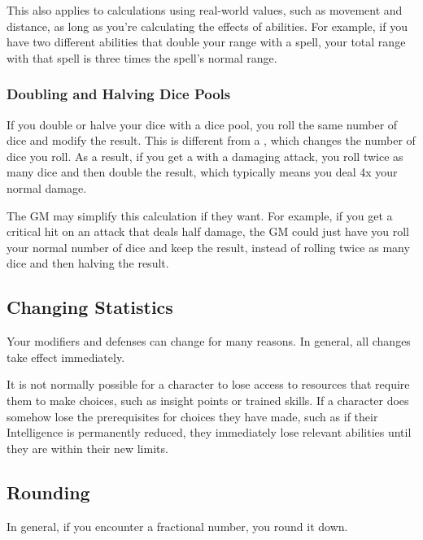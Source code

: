         This also applies to calculations using real-world values, such as movement and distance, as long as you're calculating the effects of abilities.
        For example, if you have two different abilities that double your range with a spell, your total range with that spell is three times the spell's normal range.

        \subsubsection{Doubling and Halving Dice Pools}
            If you double or halve your dice with a dice pool, you roll the same number of dice and modify the result.
            This is different from a , which changes the number of dice you roll.
            As a result, if you get a  with a damaging attack, you roll twice as many dice and then double the result, which typically means you deal 4x your normal damage.

            The GM may simplify this calculation if they want.
            For example, if you get a critical hit on an attack that deals half damage, the GM could just have you roll your normal number of dice and keep the result, instead of rolling twice as many dice and then halving the result.

    \subsection{Changing Statistics}

        Your modifiers and defenses can change for many reasons.
        In general, all changes take effect immediately.

        It is not normally possible for a character to lose access to resources that require them to make choices, such as insight points or trained skills.
        If a character does somehow lose the prerequisites for choices they have made, such as if their Intelligence is permanently reduced, they immediately lose relevant abilities until they are within their new limits.

    \subsection{Rounding}
        In general, if you encounter a fractional number, you round it down.
